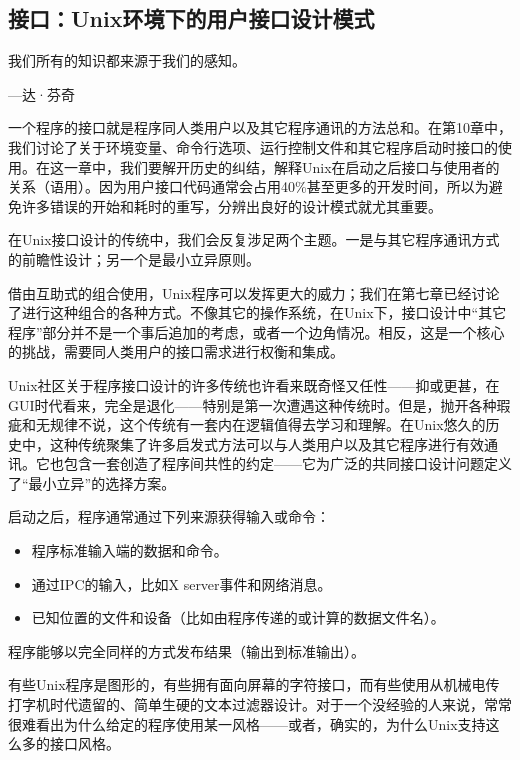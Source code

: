 \documentclass[12pt,oneside]{book}
\begin{document}
\begin{common-format}
\chapter{接口：Unix环境下的用户接口设计模式}
\begin{flushright}
\begin{notecard}{20em}
我们所有的知识都来源于我们的感知。

{\hfill —达·芬奇}
\end{notecard}
\end{flushright}

一个程序的接口就是程序同人类用户以及其它程序通讯的方法总和。在第10章中，我们讨论了关于环境变量、命令行选项、运行控制文件和其它程序启动时接口的使用。在这一章中，我们要解开历史的纠结，解释Unix在启动之后接口与使用者的关系（语用）。因为用户接口代码通常会占用40\%{}甚至更多的开发时间，所以为避免许多错误的开始和耗时的重写，分辨出良好的设计模式就尤其重要。

在Unix接口设计的传统中，我们会反复涉足两个主题。一是与其它程序通讯方式的前瞻性设计；另一个是最小立异原则。

借由互助式的组合使用，Unix程序可以发挥更大的威力；我们在第七章已经讨论了进行这种组合的各种方式。不像其它的操作系统，在Unix下，接口设计中“其它程序”部分并不是一个事后追加的考虑，或者一个边角情况。相反，这是一个核心的挑战，需要同人类用户的接口需求进行权衡和集成。

Unix社区关于程序接口设计的许多传统也许看来既奇怪又任性——抑或更甚，在GUI时代看来，完全是退化——特别是第一次遭遇这种传统时。但是，抛开各种瑕疵和无规律不说，这个传统有一套内在逻辑值得去学习和理解。在Unix悠久的历史中，这种传统聚集了许多启发式方法可以与人类用户以及其它程序进行有效通讯。它也包含一套创造了程序间共性的约定——它为广泛的共同接口设计问题定义了“最小立异”的选择方案。

启动之后，程序通常通过下列来源获得输入或命令：
\begin{itemize}
\item 程序标准输入端的数据和命令。
\item 通过IPC的输入，比如X server事件和网络消息。
\item 已知位置的文件和设备（比如由程序传递的或计算的数据文件名）。
\end{itemize}

程序能够以完全同样的方式发布结果（输出到标准输出）。

有些Unix程序是图形的，有些拥有面向屏幕的字符接口，而有些使用从机械电传打字机时代遗留的、简单生硬的文本过滤器设计。对于一个没经验的人来说，常常很难看出为什么给定的程序使用某一风格——或者，确实的，为什么Unix支持这么多的接口风格。


\end{common-format}
\end{document}
